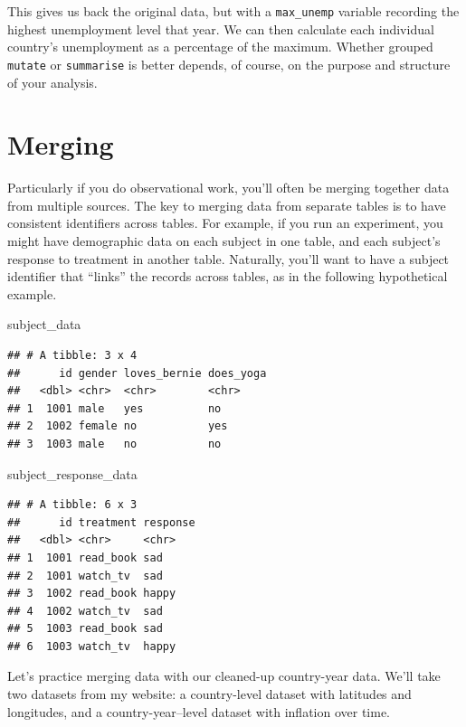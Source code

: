 \documentclass[
  12pt,
  oneside,openany]{book}
\newenvironment{Shaded}{\begin{snugshade}}{\end{snugshade}}
\newcommand{\NormalTok}[1]{#1}
\begin{document}
This gives us back the original data, but with a \texttt{max\_unemp} variable recording the highest unemployment level that year. We can then calculate each individual country's unemployment as a percentage of the maximum. Whether grouped \texttt{mutate} or \texttt{summarise} is better depends, of course, on the purpose and structure of your analysis.

\hypertarget{merging}{%
\section{Merging}\label{merging}}

Particularly if you do observational work, you'll often be merging together data from multiple sources.
The key to merging data from separate tables is to have consistent identifiers across tables. For example, if you run an experiment, you might have demographic data on each subject in one table, and each subject's response to treatment in another table. Naturally, you'll want to have a subject identifier that ``links'' the records across tables, as in the following hypothetical example.

\begin{Shaded}
\begin{Highlighting}[]
\NormalTok{subject\_data}
\end{Highlighting}
\end{Shaded}

\begin{verbatim}
## # A tibble: 3 x 4
##      id gender loves_bernie does_yoga
##   <dbl> <chr>  <chr>        <chr>    
## 1  1001 male   yes          no       
## 2  1002 female no           yes      
## 3  1003 male   no           no
\end{verbatim}

\begin{Shaded}
\begin{Highlighting}[]
\NormalTok{subject\_response\_data}
\end{Highlighting}
\end{Shaded}

\begin{verbatim}
## # A tibble: 6 x 3
##      id treatment response
##   <dbl> <chr>     <chr>   
## 1  1001 read_book sad     
## 2  1001 watch_tv  sad     
## 3  1002 read_book happy   
## 4  1002 watch_tv  sad     
## 5  1003 read_book sad     
## 6  1003 watch_tv  happy
\end{verbatim}

Let's practice merging data with our cleaned-up country-year data. We'll take two datasets from my website: a country-level dataset with latitudes and longitudes, and a country-year--level dataset with inflation over time.
\end{document}
